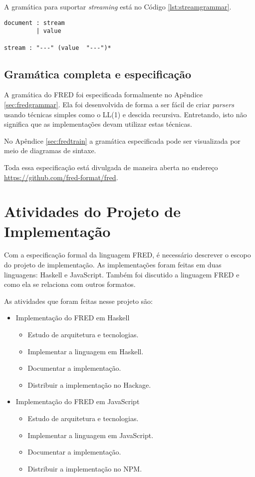 A gramática para suportar \textit{streaming} está no Código \ref{lst:streamgrammar}.

\begin{lstlisting}[caption=Gramática para streaming,label={lst:streamgrammar}]
document : stream
         | value

stream : "---" (value  "---")*
\end{lstlisting}

\subsection{Gramática completa e especificação}

A gramática do FRED foi especificada formalmente no Apêndice \ref{sec:fredgrammar}.
Ela foi desenvolvida de forma a ser fácil de criar \textit{parsers} usando técnicas 
simples como o LL(1) e descida recursiva. Entretando, isto não significa que as implementações
devam utilizar estas técnicas.

No Apêndice \ref{sec:fredtrain} a gramática especificada pode ser visualizada
por meio de diagramas de sintaxe.

Toda essa especificação está divulgada de maneira aberta no 
endereço \url{https://github.com/fred-format/fred}.
 
\section{Atividades do Projeto de Implementação}

Com a especificação formal da linguagem FRED, é necessário 
descrever o escopo do projeto de implementação. As implementações foram feitas 
em duas linguagens: Haskell e JavaScript. Também foi discutido
a linguagem FRED e como ela se relaciona com outros formatos.

As atividades que foram feitas nesse projeto são:

\begin{itemize}
    \item Implementação do FRED em Haskell
    \begin{itemize}
        \item Estudo de arquitetura e tecnologias.
        \item Implementar a linguagem em Haskell.
        \item Documentar a implementação.
        \item Distribuir a implementação no Hackage.
    \end{itemize}
    \item Implementação do FRED em JavaScript
    \begin{itemize}
        \item Estudo de arquitetura e tecnologias.
        \item Implementar a linguagem em JavaScript.
        \item Documentar a implementação.
        \item Distribuir a implementação no NPM.
    \end{itemize}
\end{itemize}

